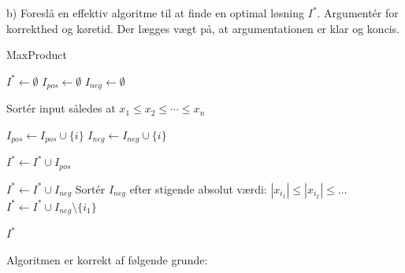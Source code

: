 \documentclass[12pt,a4paper]{article}
\begin{document}
b) Foreslå en effektiv algoritme til at finde en optimal løsning $I^*$. Argumentér for korrekthed og køretid. Der lægges vægt på, at argumentationen er klar og koncis.

\begin{algorithm}
\caption{MaxProduct}
\begin{algorithmic}[1]
        \State $I^* \gets \emptyset$ 
        \State $I_{pos} \gets \emptyset$ 
        \State $I_{neg} \gets \emptyset$ 
        
        \State Sortér input således at $x_1 \leq x_2 \leq \cdots \leq x_n$
        
                \State $I_{pos} \gets I_{pos} \cup \{i\}$
                \State $I_{neg} \gets I_{neg} \cup \{i\}$
            \EndIf
        \EndFor
        
        \State $I^* \gets I^* \cup I_{pos}$ 
        
            \State $I^* \gets I^* \cup I_{neg}$ 
        \Else
            \State Sortér $I_{neg}$ efter stigende absolut værdi: $|x_{i_1}| \leq |x_{i_2}| \leq \ldots$
            \State $I^* \gets I^* \cup I_{neg} \setminus \{i_1\}$ 
        \EndIf
        
        \State \Return $I^*$
    \EndFunction
\end{algorithmic}
\end{algorithm}
Algoritmen er korrekt af følgende grunde:
\end{document}
